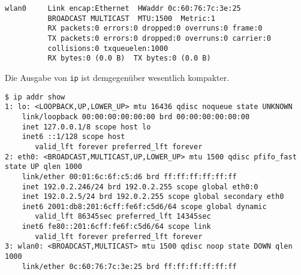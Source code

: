 \begin{normaltext}
\begin{verbatim}
wlan0     Link encap:Ethernet  HWaddr 0c:60:76:7c:3e:25  
          BROADCAST MULTICAST  MTU:1500  Metric:1
          RX packets:0 errors:0 dropped:0 overruns:0 frame:0
          TX packets:0 errors:0 dropped:0 overruns:0 carrier:0
          collisions:0 txqueuelen:1000 
          RX bytes:0 (0.0 B)  TX bytes:0 (0.0 B)
  \end{verbatim}
  Die Ausgabe von \verb?ip? ist demgegenüber wesentlich kompakter.
  \begin{verbatim}
$ ip addr show
1: lo: <LOOPBACK,UP,LOWER_UP> mtu 16436 qdisc noqueue state UNKNOWN 
    link/loopback 00:00:00:00:00:00 brd 00:00:00:00:00:00
    inet 127.0.0.1/8 scope host lo
    inet6 ::1/128 scope host 
       valid_lft forever preferred_lft forever
2: eth0: <BROADCAST,MULTICAST,UP,LOWER_UP> mtu 1500 qdisc pfifo_fast state UP qlen 1000
    link/ether 00:01:6c:6f:c5:d6 brd ff:ff:ff:ff:ff:ff
    inet 192.0.2.246/24 brd 192.0.2.255 scope global eth0:0
    inet 192.0.2.5/24 brd 192.0.2.255 scope global secondary eth0
    inet6 2001:db8:201:6cff:fe6f:c5d6/64 scope global dynamic 
       valid_lft 86345sec preferred_lft 14345sec
    inet6 fe80::201:6cff:fe6f:c5d6/64 scope link 
       valid_lft forever preferred_lft forever
3: wlan0: <BROADCAST,MULTICAST> mtu 1500 qdisc noop state DOWN qlen 1000
    link/ether 0c:60:76:7c:3e:25 brd ff:ff:ff:ff:ff:ff
  \end{verbatim}

\end{normaltext}

